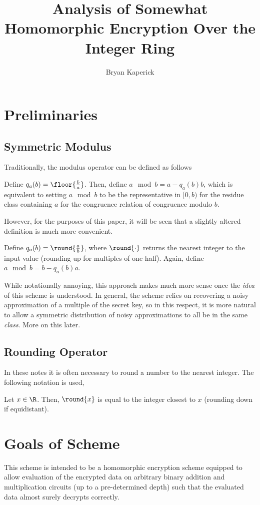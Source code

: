 \documentclass[a4paper,11pt, oneside]{article}
\title{Analysis of Somewhat Homomorphic Encryption Over the Integer Ring}
\author{Bryan Kaperick}
\begin{document}
\maketitle\newpage
\section{Preliminaries}
\subsection{Symmetric Modulus}
Traditionally, the modulus operator can be defined as follows
\begin{definition}
  Define $q_a(b) = \floor{\frac{b}{a}}$.  Then, define $a\mod{b} = a - q_a(b)b$, which is equivalent to setting $a\mod{b}$ to be the representative in $[0,b)$ for the residue class containing $a$ for the congruence relation of congruence modulo $b$.
\end{definition}

However, for the purposes of this paper, it will be seen that a slightly altered definition is much more convenient.
\begin{definition}
  Define $q_a(b) = \round{\frac{a}{b}}$, where $\round{\cdot}$ returns the nearest integer to the input value (rounding up for multiples of one-half).  Again, define $a\mod{b} = b - q_a(b)a$.  
\end{definition}

While notationally annoying, this approach makes much more sense once the \emph{idea} of this scheme is understood.  In general, the scheme relies on recovering a noisy approximation of a multiple of the secret key, so in this respect, it is more natural to allow a symmetric distribution of noisy approximations to all be in the same \emph{class}.  More on this later.

\subsection{Rounding Operator}

In these notes it is often necessary to round a number to the nearest integer.  The following notation is used,
\begin{definition}
  Let $x\in\R$.  Then, $\round{x}$ is equal to the integer closest to $x$ (rounding down if equidistant).
\end{definition}

\section{Goals of Scheme}
This scheme is intended to be a homomorphic encryption scheme equipped to allow evaluation of the encrypted data on arbitrary binary addition and multiplication circuits (up to a pre-determined depth) such that the evaluated data almost surely decrypts correctly.  
\end{document}
